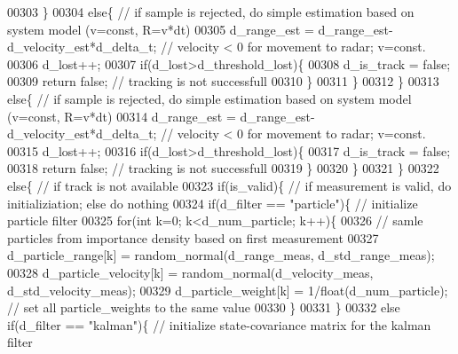 \begin{DoxyCode}
00303                 \}
00304                 \textcolor{keywordflow}{else}\{ \textcolor{comment}{// if sample is rejected, do simple estimation based on system model (v=const,
       R=v*dt)}
00305                     d\_range\_est = d\_range\_est-d\_velocity\_est*d_delta_t; \textcolor{comment}{// velocity < 0 for movement to
       radar; v=const.}
00306                     d_lost++;
00307                     \textcolor{keywordflow}{if}(d_lost>d_threshold_lost)\{
00308                         d_is_track = \textcolor{keyword}{false};
00309                         \textcolor{keywordflow}{return} \textcolor{keyword}{false}; \textcolor{comment}{// tracking is not successfull}
00310                     \}
00311                 \}
00312             \}
00313             \textcolor{keywordflow}{else}\{ \textcolor{comment}{// if sample is rejected, do simple estimation based on system model (v=const, R=v*dt)}
00314                 d_range_est = d_range_est-d_velocity_est*d_delta_t; \textcolor{comment}{// velocity < 0 for movement to radar;
       v=const.}
00315                 d_lost++;
00316                 \textcolor{keywordflow}{if}(d_lost>d_threshold_lost)\{
00317                     d_is_track = \textcolor{keyword}{false};
00318                     \textcolor{keywordflow}{return} \textcolor{keyword}{false}; \textcolor{comment}{// tracking is not successfull}
00319                 \}
00320             \}
00321         \}
00322         \textcolor{keywordflow}{else}\{ \textcolor{comment}{// if track is not available}
00323             \textcolor{keywordflow}{if}(is\_valid)\{ \textcolor{comment}{// if measurement is valid, do initializiation; else do nothing}
00324                 \textcolor{keywordflow}{if}(d_filter == \textcolor{stringliteral}{"particle"})\{ \textcolor{comment}{// initialize particle filter}
00325                     \textcolor{keywordflow}{for}(\textcolor{keywordtype}{int} k=0; k<d_num_particle; k++)\{
00326                         \textcolor{comment}{// samle particles from importance density based on first measurement}
00327                         d_particle_range[k] = random_normal(d_range_meas, 
      d_std_range_meas);
00328                         d_particle_velocity[k] = random_normal(d_velocity_meas, 
      d_std_velocity_meas);
00329                         d_particle_weight[k] = 1/float(d\_num\_particle); \textcolor{comment}{// set all particle\_weights to the
       same value}
00330                     \}
00331                 \}
00332                 \textcolor{keywordflow}{else} \textcolor{keywordflow}{if}(d_filter == \textcolor{stringliteral}{"kalman"})\{ \textcolor{comment}{// initialize state-covariance matrix for the kalman filter}

\end{DoxyCode}
